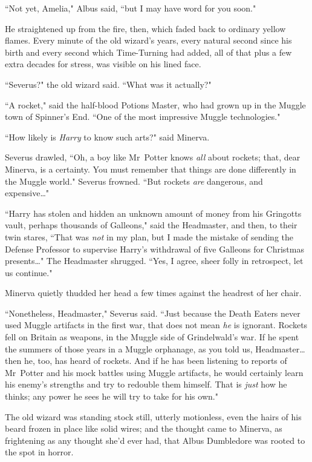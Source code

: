 ``Not yet, Amelia," Albus said, ``but I may have word for you soon."

He straightened up from the fire, then, which faded back to ordinary yellow flames. Every minute of the old wizard's years, every natural second since his birth and every second which Time-Turning had added, all of that plus a few extra decades for stress, was visible on his lined face.

``Severus?" the old wizard said. ``What was it actually?"

``A rocket," said the half-blood Potions Master, who had grown up in the Muggle town of Spinner's End. ``One of the most impressive Muggle technologies."

``How likely is \emph{Harry} to know such arts?" said Minerva.

Severus drawled, ``Oh, a boy like Mr~Potter knows \emph{all} about rockets; that, dear Minerva, is a certainty. You must remember that things are done differently in the Muggle world." Severus frowned. ``But rockets \emph{are} dangerous, and expensive{\ldots}"

``Harry has stolen and hidden an unknown amount of money from his Gringotts vault, perhaps thousands of Galleons," said the Headmaster, and then, to their twin stares, ``That was \emph{not} in my plan, but I made the mistake of sending the Defense Professor to supervise Harry's withdrawal of five Galleons for Christmas presents{\ldots}" The Headmaster shrugged. ``Yes, I agree, sheer folly in retrospect, let us continue."

Minerva quietly thudded her head a few times against the headrest of her chair.

``Nonetheless, Headmaster," Severus said. ``Just because the Death Eaters never used Muggle artifacts in the first war, that does not mean \emph{he} is ignorant. Rockets fell on Britain as weapons, in the Muggle side of Grindelwald's war. If he spent the summers of those years in a Muggle orphanage, as you told us, Headmaster{\ldots} then he, too, has heard of rockets. And if he has been listening to reports of Mr~Potter and his mock battles using Muggle artifacts, he would certainly learn his enemy's strengths and try to redouble them himself. That is \emph{just} how he thinks; any power he sees he will try to take for his own."

The old wizard was standing stock still, utterly motionless, even the hairs of his beard frozen in place like solid wires; and the thought came to Minerva, as frightening as any thought she'd ever had, that Albus Dumbledore was rooted to the spot in horror.

